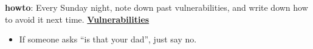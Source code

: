 \documentclass[11pt]{article}
\newcommand{\comments}[1]{}
\begin{document}
{            \textbf{howto}: Every Sunday night, note down  past vulnerabilities, and write down how to avoid it next time. 
            \textbf{\small \underline{Vulnerabilities}} \\
            \begin{itemize}
              \tiny \item \tiny  If someone asks ``is that your dad'', just say no. 
            \end{itemize}    
            \newpage 
            
            \comments{
              \noindent\begin{minipage}{\textwidth}
              \begin{minipage}[c][6cm][c]{\dimexpr0.5\textwidth-0.5\Colsep\relax}
                \lipsum[4]
              \end{minipage}\hfill
              \begin{minipage}[c][6cm][c]{\dimexpr0.5\textwidth-0.5\Colsep\relax}
                \lipsum[4]
              \end{minipage}%
              \end{minipage}
              \lipsum[4]
            }
            
}
\end{document}
